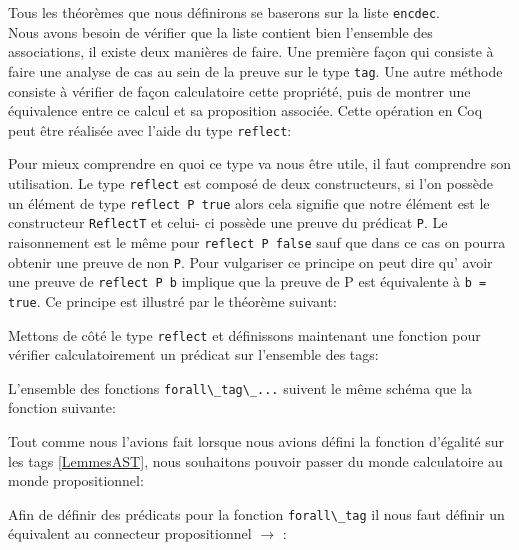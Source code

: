 \documentclass {article}
\newcommand{\codefrom}[3]
           {}
\theoremstyle{definition}
\theoremstyle{remark}
\newcommand{\fun}[1]{\lstinline!#1!}
\begin{document}
Tous les théorèmes que nous définirons se baserons sur la liste \fun{encdec}. \\
Nous avons besoin de vérifier que la liste contient bien l'ensemble des associations,
il existe deux manières de faire. Une première façon qui consiste à faire une analyse de cas
au sein de la preuve sur le type \fun{tag}.
Une autre méthode consiste à vérifier de façon calculatoire cette propriété, puis de montrer
une équivalence entre ce calcul et sa proposition associée. 
Cette opération en Coq peut être réalisée avec l'aide du type \fun{reflect}:

\codefrom{rapport}{definitions}{reflect}

Pour mieux comprendre en quoi ce type va nous être utile, il faut comprendre son utilisation.
Le type \fun{reflect} est composé de deux constructeurs, si l'on possède un élément de type
\fun{reflect P true} alors cela signifie que notre élément est le constructeur \fun{ReflectT}
et celui- ci possède une preuve du prédicat \fun{P}. Le raisonnement est le même pour \fun{reflect P false}
sauf que dans ce cas on pourra obtenir une preuve de non \fun{P}. Pour vulgariser ce
principe on peut dire qu' avoir une preuve de \fun{reflect P b} implique que la preuve
de P est équivalente à \fun{b = true}. Ce principe est illustré par le théorème suivant:

\codefrom{rapport}{definitions}{reflect_iff}


Mettons de côté le type \fun{reflect} et définissons maintenant une fonction
pour vérifier calculatoirement un prédicat sur l'ensemble des tags:

\codefrom{src}{association_list}{forall_tag}

L'ensemble des fonctions \fun{forall\_tag\_...} suivent le même schéma que la fonction suivante:

\codefrom{src}{association_list}{forall_tag_uno}

Tout comme nous l'avions fait lorsque nous avions défini la fonction d'égalité sur les tags \ref{LemmesAST},
nous souhaitons pouvoir passer du monde calculatoire au monde propositionnel:

\codefrom{src}{association_list}{helpBefore1}
\codefrom{src}{association_list}{helpBefore2}

Afin de définir des prédicats pour la fonction \fun{forall\_tag} il nous faut définir un
équivalent au connecteur propositionnel \ensuremath{\rightarrow} :

\codefrom{src}{association_list}{imply}
\end{document}
